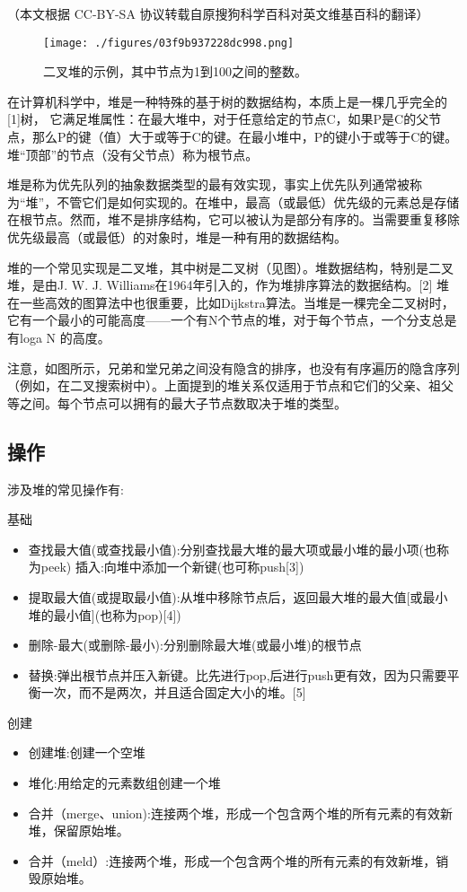 
（本文根据 CC-BY-SA 协议转载自原搜狗科学百科对英文维基百科的翻译）

\begin{figure}[ht]
\centering
\texttt{[image: ./figures/03f9b937228dc998.png]}
\caption{二叉堆的示例，其中节点为1到100之间的整数。} \label{fig_DUI_3}
\end{figure}
在计算机科学中，堆是一种特殊的基于树的数据结构，本质上是一棵几乎完全的[1]树， 它满足堆属性：在最大堆中，对于任意给定的节点C，如果P是C的父节点，那么P的键（值）大于或等于C的键。在最小堆中，P的键小于或等于C的键。堆“顶部”的节点（没有父节点）称为根节点。

堆是称为优先队列的抽象数据类型的最有效实现，事实上优先队列通常被称为“堆”，不管它们是如何实现的。在堆中，最高（或最低）优先级的元素总是存储在根节点。然而，堆不是排序结构，它可以被认为是部分有序的。当需要重复移除优先级最高（或最低）的对象时，堆是一种有用的数据结构。

堆的一个常见实现是二叉堆，其中树是二叉树（见图）。堆数据结构，特别是二叉堆，是由J. W. J. Williams在1964年引入的，作为堆排序算法的数据结构。[2] 堆在一些高效的图算法中也很重要，比如Dijkstra算法。当堆是一棵完全二叉树时，它有一个最小的可能高度——一个有N个节点的堆，对于每个节点，一个分支总是有loga N 的高度。

注意，如图所示，兄弟和堂兄弟之间没有隐含的排序，也没有有序遍历的隐含序列（例如，在二叉搜索树中）。上面提到的堆关系仅适用于节点和它们的父亲、祖父等之间。每个节点可以拥有的最大子节点数取决于堆的类型。

\subsection{操作}
涉及堆的常见操作有:

基础
\begin{itemize}
\item 查找最大值(或查找最小值):分别查找最大堆的最大项或最小堆的最小项(也称为peek)
插入:向堆中添加一个新键(也可称push[3])
\item 提取最大值(或提取最小值):从堆中移除节点后，返回最大堆的最大值[或最小堆的最小值](也称为pop)[4])
\item 删除-最大(或删除-最小):分别删除最大堆(或最小堆)的根节点
\item 替换:弹出根节点并压入新键。比先进行pop,后进行push更有效，因为只需要平衡一次，而不是两次，并且适合固定大小的堆。[5]
\end{itemize}

创建
\begin{itemize}
\item 创建堆:创建一个空堆
\item 堆化:用给定的元素数组创建一个堆
\item 合并（merge、union):连接两个堆，形成一个包含两个堆的所有元素的有效新堆，保留原始堆。
\item 合并（meld）:连接两个堆，形成一个包含两个堆的所有元素的有效新堆，销毁原始堆。
\end{itemize}

